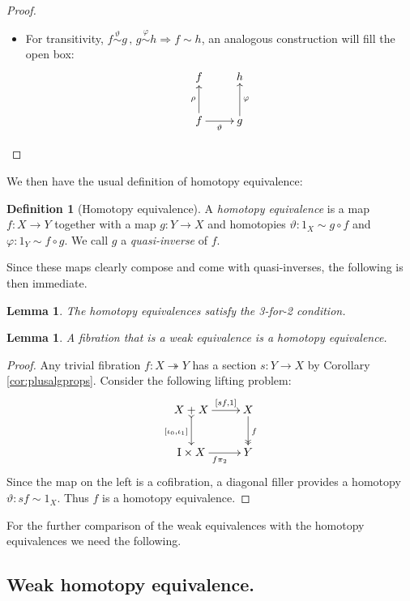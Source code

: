 \documentclass[11pt,reqno]{amsart}
\newcommand{\ra}{\ensuremath{\rightarrow}}
\renewcommand{\to}{\ensuremath{\rightarrow}}
\newcommand{\onto}{\ensuremath{\twoheadrightarrow}}
\newcommand{\I}{\ensuremath{\mathrm{I}}}
\newtheorem{lemma}[theorem]{Lemma}
\theoremstyle{remark}
\theoremstyle{definition}
\newtheorem{definition}[theorem]{Definition}
\begin{document}
\begin{proof}
\begin{itemize}
\item For transitivity, $f\stackrel{\vartheta}{\sim} g\,,\, g\stackrel{\varphi}{\sim} h\Rightarrow f\sim h$, an analogous  construction will fill the open box:
\begin{equation*}%
\xymatrix{
f  & h  \\
f \ar[u]^{\rho} \ar[r]_\vartheta & g \ar[u]_\varphi
}
\end{equation*}
\end{itemize}
\end{proof}

We then have the usual definition of homotopy equivalence: 
\begin{definition}[Homotopy equivalence]\label{def:homotopyequivalence} 
A \emph{homotopy equivalence} is a map $f : X\to Y$ together with a map $g: Y\ra X$ and homotopies $\vartheta : 1_X \sim g\circ f$ and $\varphi : 1_Y\sim f\circ g$.  We call $g$ a \emph{quasi-inverse} of $f$.
\end{definition}
%
Since these maps clearly compose and come with quasi-inverses, the following is then immediate.
%
\begin{lemma}\label{lemma:HE342}
The  homotopy equivalences satisfy the 3-for-2 condition. 
\end{lemma}

\begin{lemma}\label{lem:TFibisHE}
A fibration that is a weak equivalence is a homotopy equivalence.
\end{lemma}
\begin{proof}
Any trivial fibration $f : X \onto Y$ has a section $s: Y\to X$ by Corollary \ref{cor:plusalgprops}.
Consider the following lifting problem:
\begin{equation*}%
\xymatrix{
X+X \ar@{>->}[d]_{[\iota_0, \iota_1]} \ar[r]^-{[sf, 1]}  & X\ar@{>>}[d]^{f} \\
\I\times X \ar[r]_{f\pi_2} & Y
}
\end{equation*}
Since the map on the left is a cofibration, a diagonal filler provides a homotopy $\vartheta : sf \sim 1_X$. 
Thus $f$ is a homotopy equivalence. 
\end{proof}

For the further comparison of the weak equivalences with the homotopy equivalences we need the following.

\subsection*{Weak homotopy equivalence.}
\end{document}
